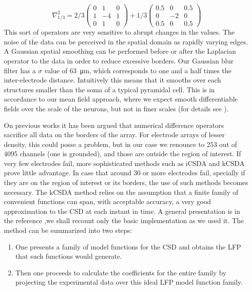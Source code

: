 \documentclass[utf8]{frontiersSCNS}
\newcommand{\mum}[1]{\SI{#1}{\micro\metre}}
\begin{document}
\begin{equation}
\nabla^2_{1/3}=2/3
\begin{pmatrix}
  0 & 1 & 0 \\
  1 & -4 & 1 \\
  0 & 1 & 0
\end{pmatrix}
+1/3
\begin{pmatrix}
  0.5 & 0 & 0.5 \\
  0 & -2 & 0 \\
  0.5 & 0 & 0.5
\end{pmatrix}  
\end{equation}
This sort of operators are very sensitive to abrupt changes in the values.
The noise of the data can be perceived in the spatial domain as rapidly varying edges. A Gaussian spatial smoothing
can be performed before or after the Laplacian operator to the data in order to reduce excessive borders. Our Gaussian blur filter has a $ \sigma$ value of \mum{63}, which corresponds to one and a half times the inter-electrode distance.
Intuitively this means that it smooths over each structures smaller than the soma of a typical pyramidal cell. 
This is  in accordance to our mean field approach, where we expect smooth differentiable fields over the scale of the neurons, but not in finer scales (for details see \citep{Bedard11}).

On previous works it has been argued that numerical difference operators sacrifice all data on the borders of the array. For electrode arrays of lesser density, this could posse a problem, but in our case we renounce to 253 out of 4095 channels (one is grounded), and those are outside the region of interest.
If very few electrodes fail, more sophisticated methods such as iCSDA \citep{Leski2011} and kCSDA \citep{Potworowski2011} prove little advantage.
In case that around 30 or more electrodes
fail, specially if they are on the region of interest or its borders,
the use of such methods
becomes necessary. The kCSDA method relies on the
assumption that a finite family of convenient functions can span, with acceptable accuracy, a very good approximation to the  CSD at each instant in time.
A general presentation is in the reference \citep{Potworowski2011},we shall recount only the basic implementation as we used it. The
method can be summarized into two steps:
\begin{enumerate}
\item One presents a family of model functions for the CSD and
obtains the LFP that such functions
would generate.
\item Then one proceeds to calculate
  the coefficients for the entire family by projecting the
  experimental data over this ideal LFP model function family.
\end{enumerate}
\end{document}
